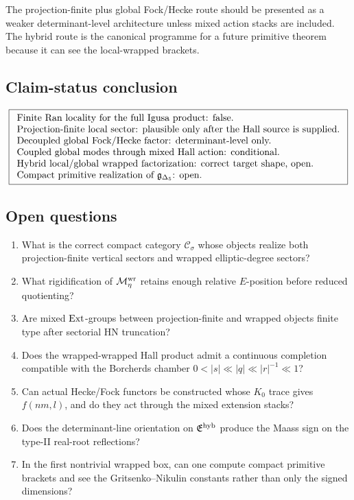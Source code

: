 The projection-finite plus global Fock/Hecke route should be presented
as a weaker determinant-level architecture unless mixed action stacks
are included.  The hybrid route is the canonical programme for a
future primitive theorem because it can see the local-wrapped brackets.

\subsection{Claim-status conclusion}

\[
\boxed{
\begin{array}{l}
\text{Finite Ran locality for the full Igusa product: false.}\\
\text{Projection-finite local sector: plausible only after the Hall
source is supplied.}\\
\text{Decoupled global Fock/Hecke factor: determinant-level only.}\\
\text{Coupled global modes through mixed Hall action: conditional.}\\
\text{Hybrid local/global wrapped factorization: correct target shape,
open.}\\
\text{Compact primitive realization of }\mathfrak g_{\Delta_5}\text{: open.}
\end{array}}
\]

\subsection{Open questions}

\begin{enumerate}
\item What is the correct compact category \(\mathcal C_\sigma\) whose
objects realize both projection-finite vertical sectors and wrapped
elliptic-degree sectors?
\item What rigidification of \(\mathcal M^{\mathrm{wr}}_\eta\) retains enough relative
\(E\)-position before reduced quotienting?
\item Are mixed \(\operatorname{Ext}\)-groups between projection-finite and wrapped
objects finite type after sectorial HN truncation?
\item Does the wrapped-wrapped Hall product admit a continuous
completion compatible with the Borcherds chamber
\(0<|s|\ll |q|\ll |r|^{-1}\ll1\)?
\item Can actual Hecke/Fock functors be constructed whose \(K_0\)
trace gives \(f(nm,l)\), and do they act through the mixed extension
stacks?
\item Does the determinant-line orientation on \(\mathfrak E^{\mathrm{hyb}}\) produce the
Maass sign on the type-II real-root reflections?
\item In the first nontrivial wrapped box, can one compute compact
primitive brackets and see the Gritsenko--Nikulin constants rather than
only the signed dimensions?
\end{enumerate}

